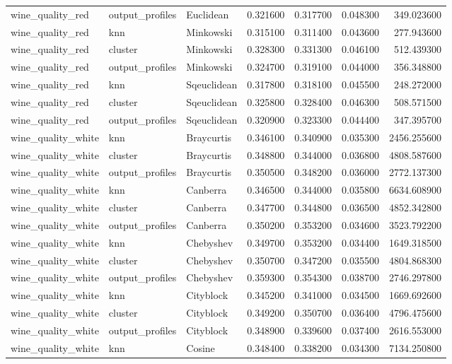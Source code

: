 \begin{tabular}{lllrrrr}
wine\_quality\_red & output\_profiles & Euclidean & 0.321600 & 0.317700 & 0.048300 & 349.023600 \\
wine\_quality\_red & knn & Minkowski & 0.315100 & 0.311400 & 0.043600 & 277.943600 \\
wine\_quality\_red & cluster & Minkowski & 0.328300 & 0.331300 & 0.046100 & 512.439300 \\
wine\_quality\_red & output\_profiles & Minkowski & 0.324700 & 0.319100 & 0.044000 & 356.348800 \\
wine\_quality\_red & knn & Sqeuclidean & 0.317800 & 0.318100 & 0.045500 & 248.272000 \\
wine\_quality\_red & cluster & Sqeuclidean & 0.325800 & 0.328400 & 0.046300 & 508.571500 \\
wine\_quality\_red & output\_profiles & Sqeuclidean & 0.320900 & 0.323300 & 0.044400 & 347.395700 \\
wine\_quality\_white & knn & Braycurtis & 0.346100 & 0.340900 & 0.035300 & 2456.255600 \\
wine\_quality\_white & cluster & Braycurtis & 0.348800 & 0.344000 & 0.036800 & 4808.587600 \\
wine\_quality\_white & output\_profiles & Braycurtis & 0.350500 & 0.348200 & 0.036000 & 2772.137300 \\
wine\_quality\_white & knn & Canberra & 0.346500 & 0.344000 & 0.035800 & 6634.608900 \\
wine\_quality\_white & cluster & Canberra & 0.347700 & 0.344800 & 0.036500 & 4852.342800 \\
wine\_quality\_white & output\_profiles & Canberra & 0.350200 & 0.353200 & 0.034600 & 3523.792200 \\
wine\_quality\_white & knn & Chebyshev & 0.349700 & 0.353200 & 0.034400 & 1649.318500 \\
wine\_quality\_white & cluster & Chebyshev & 0.350700 & 0.347200 & 0.035500 & 4804.868300 \\
wine\_quality\_white & output\_profiles & Chebyshev & 0.359300 & 0.354300 & 0.038700 & 2746.297800 \\
wine\_quality\_white & knn & Cityblock & 0.345200 & 0.341000 & 0.034500 & 1669.692600 \\
wine\_quality\_white & cluster & Cityblock & 0.349200 & 0.350700 & 0.036400 & 4796.475600 \\
wine\_quality\_white & output\_profiles & Cityblock & 0.348900 & 0.339600 & 0.037400 & 2616.553000 \\
wine\_quality\_white & knn & Cosine & 0.348400 & 0.338200 & 0.034300 & 7134.250800 \\

\end{tabular}
